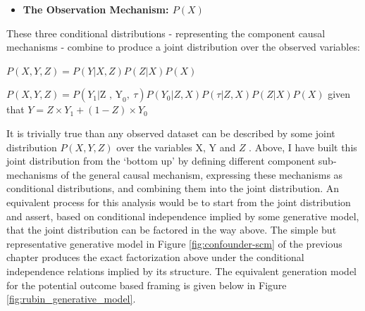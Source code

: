 \documentclass[../main.tex]{subfiles}
\begin{document}
\begin{itemize}
\vspace{\baselineskip}
	\item \textbf{The Observation Mechanism:  \( P \left( X \right)  \)  }
\end{itemize}\par


\vspace{\baselineskip}
These three conditional distributions - representing the component causal mechanisms - combine to produce a joint distribution over the observed variables:\par


\vspace{\baselineskip}
\begin{adjustwidth}{0.5in}{0.0in}
 \( P \left( X, Y, Z \right)  = P \left( Y \vert X, Z \right) P \left( Z  \vert  X \right) P \left( X \right)  \) \par

\end{adjustwidth}

\begin{adjustwidth}{0.5in}{0.0in}
 \( P \left( X, Y, Z \right)  = P \left( Y_{1}  \vert  \text{Z , Y}_{0},~ \tau \right) P \left( Y_{0} \vert Z, X \right) P \left(  \tau \vert Z, X \right) P \left( Z  \vert  X \right) P \left( X \right)  \) given that  \(  Y=Z \times Y_{1}+ \left( 1-Z \right)  \times Y_{0} \) \par

\end{adjustwidth}


\vspace{\baselineskip}
It is trivially true than any observed dataset can be described by some joint distribution  \( P \left( X, Y, Z \right)  \)  over the variables  \( \text{X, Y} \) and  \( Z \) . Above, I have built this joint distribution from the ‘bottom up’ by defining different component sub-mechanisms of the general causal mechanism, expressing these mechanisms as conditional distributions, and combining them into the joint distribution. An equivalent process for this analysis would be to start from the joint distribution and assert, based on conditional independence implied by some generative model, that the joint distribution can be factored in the way above. The simple but representative generative model in Figure \ref{fig:confounder-scm} of the previous chapter produces the exact factorization above under the conditional independence relations implied by its structure. The equivalent generation model for the potential outcome based framing is given below in Figure \ref{fig:rubin_generative_model}.\par
\end{document}
